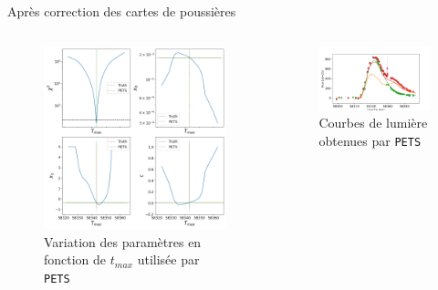 \documentclass{beamer}
\def\pets{\texttt{PETS}\xspace}
\begin{document}
\begin{frame}{Après correction des cartes de poussières}
\begin{columns}
\begin{column}{.5\textwidth}
\begin{figure}
	\centering
	\includegraphics[width=.9\textwidth]{figures/26_pets_new.png}
	\caption{Variation des paramètres en fonction de $t_{max}$ utilisée par \pets}
\end{figure}
\end{column}

\begin{column}{.5\textwidth}
\begin{figure}
	\centering
	\includegraphics[width=.9\textwidth]{figures/26_lc_pets_new.png}
	\caption{Courbes de lumière obtenues par \pets}
\end{figure}
\end{column}
\end{columns}
\end{frame}
\end{document}
